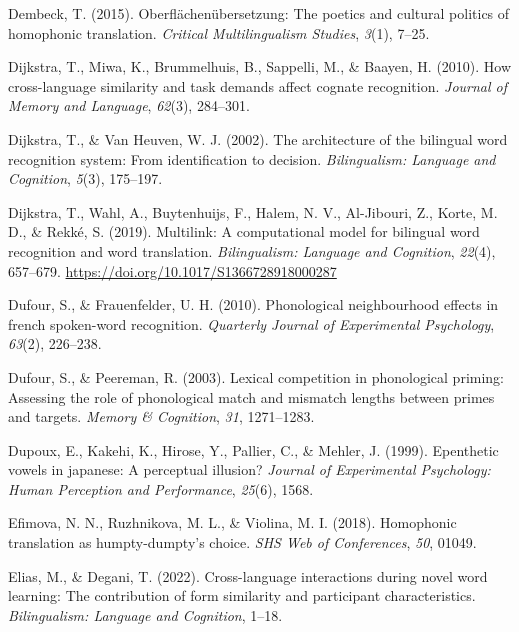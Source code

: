 \documentclass[
]{article}
\newlength{\cslhangindent}
\newenvironment{CSLReferences}[2] %
 {\begin{list}{}{%
  \setlength{\itemindent}{0pt}
  \setlength{\leftmargin}{0pt}
  \setlength{\parsep}{0pt}
  \ifodd #1
   \setlength{\leftmargin}{\cslhangindent}
   \setlength{\itemindent}{-1\cslhangindent}
  \fi
  \setlength{\itemsep}{#2\baselineskip}}}
 {\end{list}}
\begin{document}
\begin{CSLReferences}{1}{0}
Dembeck, T. (2015). Oberfl{ä}chen{ü}bersetzung: The poetics and cultural
politics of homophonic translation. \emph{Critical Multilingualism
Studies}, \emph{3}(1), 7--25.

Dijkstra, T., Miwa, K., Brummelhuis, B., Sappelli, M., \& Baayen, H.
(2010). How cross-language similarity and task demands affect cognate
recognition. \emph{Journal of Memory and Language}, \emph{62}(3),
284--301.

Dijkstra, T., \& Van Heuven, W. J. (2002). The architecture of the
bilingual word recognition system: {From} identification to decision.
\emph{Bilingualism: Language and Cognition}, \emph{5}(3), 175--197.

Dijkstra, T., Wahl, A., Buytenhuijs, F., Halem, N. V., Al-Jibouri, Z.,
Korte, M. D., \& Rekké, S. (2019). Multilink: A computational model for
bilingual word recognition and word translation. \emph{Bilingualism:
Language and Cognition}, \emph{22}(4), 657--679.
\url{https://doi.org/10.1017/S1366728918000287}

Dufour, S., \& Frauenfelder, U. H. (2010). Phonological neighbourhood
effects in french spoken-word recognition. \emph{Quarterly Journal of
Experimental Psychology}, \emph{63}(2), 226--238.

Dufour, S., \& Peereman, R. (2003). Lexical competition in phonological
priming: {Assessing} the role of phonological match and mismatch lengths
between primes and targets. \emph{Memory \& Cognition}, \emph{31},
1271--1283.

Dupoux, E., Kakehi, K., Hirose, Y., Pallier, C., \& Mehler, J. (1999).
Epenthetic vowels in japanese: A perceptual illusion? \emph{Journal of
Experimental Psychology: Human Perception and Performance},
\emph{25}(6), 1568.

Efimova, N. N., Ruzhnikova, M. L., \& Violina, M. I. (2018). Homophonic
translation as humpty-dumpty's choice. \emph{SHS Web of Conferences},
\emph{50}, 01049.

Elias, M., \& Degani, T. (2022). Cross-language interactions during
novel word learning: {The} contribution of form similarity and
participant characteristics. \emph{Bilingualism: Language and
Cognition}, 1--18.


\end{CSLReferences}
\end{document}
